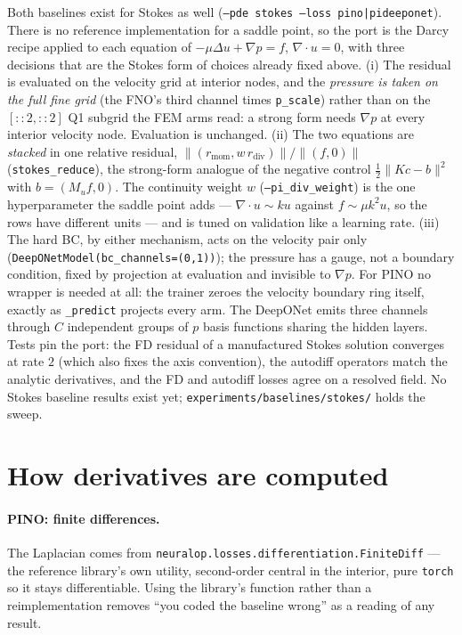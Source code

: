 \documentclass[11pt]{article}
\begin{document}
Both baselines exist for Stokes as well (\texttt{--pde stokes --loss pino|pideeponet}). There is
no reference implementation for a saddle point, so the port is the Darcy recipe applied to each
equation of $-\mu\Delta u + \nabla p = f$, $\nabla\cdot u = 0$, with three decisions that are the
Stokes form of choices already fixed above. (i) The residual is evaluated on the velocity grid at
interior nodes, and the \emph{pressure is taken on the full fine grid} (the FNO's third channel
times \texttt{p\_scale}) rather than on the $[::2,::2]$ Q1 subgrid the FEM arms read: a strong form
needs $\nabla p$ at every interior velocity node. Evaluation is unchanged. (ii) The two equations
are \emph{stacked} in one relative residual, $\|(r_{\mathrm{mom}}, w\,r_{\mathrm{div}})\|/\|(f,0)\|$
(\texttt{stokes\_reduce}), the strong-form analogue of the negative control $\tfrac12\|Kc-b\|^2$ with
$b=(M_u f, 0)$. The continuity weight $w$ (\texttt{--pi\_div\_weight}) is the one hyperparameter the
saddle point adds --- $\nabla\cdot u\sim k u$ against $f\sim\mu k^2 u$, so the rows have different
units --- and is tuned on validation like a learning rate. (iii) The hard BC, by either mechanism,
acts on the velocity pair only (\texttt{DeepONetModel(bc\_channels=(0,1))}); the pressure has a gauge,
not a boundary condition, fixed by projection at evaluation and invisible to $\nabla p$. For PINO no
wrapper is needed at all: the trainer zeroes the velocity boundary ring itself, exactly as
\texttt{\_predict} projects every arm. The DeepONet emits three channels through $C$ independent
groups of $p$ basis functions sharing the hidden layers. Tests pin the port: the FD residual of a
manufactured Stokes solution converges at rate $2$ (which also fixes the axis convention), the
autodiff operators match the analytic derivatives, and the FD and autodiff losses agree on a resolved
field. No Stokes baseline results exist yet; \texttt{experiments/baselines/stokes/} holds the sweep.

\section*{How derivatives are computed}

\paragraph{PINO: finite differences.} The Laplacian comes from
\texttt{neuralop.losses.differentiation.FiniteDiff} --- the reference library's own utility,
second-order central in the interior, pure \texttt{torch} so it stays differentiable. Using the
library's function rather than a reimplementation removes ``you coded the baseline wrong'' as a
reading of any result.
\end{document}
